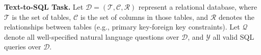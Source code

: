 







\textbf{Text-to-SQL Task.}
Let $\mathcal{D} = (\mathcal{T}, \mathcal{C}, \mathcal{R})$ represent a relational database, where $\mathcal{T}$ is the set of tables, $\mathcal{C}$ is the set of columns in those tables, and $\mathcal{R}$ denotes the relationships between tables (e.g., primary key-foreign key constraints). Let $\mathcal{Q}$ denote all well-specified natural language questions over $\mathcal{D}$, and $\mathcal{Y}$ all valid SQL queries over $\mathcal{D}$.

